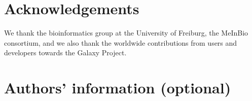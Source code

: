 \documentclass[a4paper,num-refs]{oup-contemporary}
\begin{document}
\section{Acknowledgements}

We thank the bioinformatics group at the University of Freiburg, 
the MeInBio consortium, and we also thank the worldwide contributions from users and developers towards the Galaxy Project.





\section{Authors' information (optional)}



\end{document}
